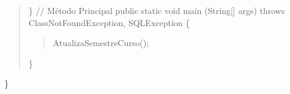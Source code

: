 \begin{quote}
\begin{quote}
	\end{quote}
	\}	\newline
	\newline 
	// Método Principal \newline
	public static void main (String[] args) throws ClassNotFoundException, SQLException \{
	\begin{quote}
		AtualizaSemestreCurso();
	\end{quote}	
	\}		
\end{quote}
		\}
	
